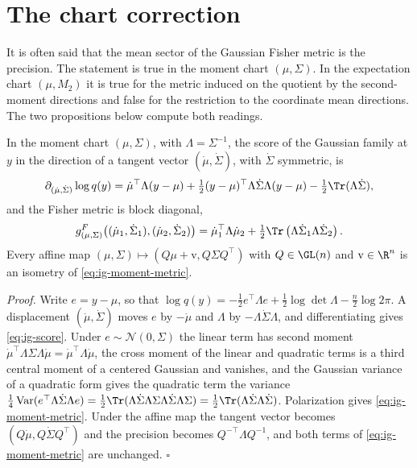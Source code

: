 \section{The chart correction}
\label{sec:ig-chart}

It is often said that the mean sector of the Gaussian Fisher metric is the
precision. The statement is true in the moment chart \((\mu,\Sigma)\). In the
expectation chart \((\mu,M_2)\) it is true for the metric induced on the
quotient by the second-moment directions and false for the restriction to the
coordinate mean directions. The two propositions below compute both readings.

In the moment chart \((\mu,\Sigma)\), with \(\Lambda=\Sigma^{-1}\), the score of
the Gaussian family at \(y\) in the direction of a tangent vector
\((\dot\mu,\dot\Sigma)\), with \(\dot\Sigma\) symmetric, is
\begin{equation}
\partial_{(\dot\mu,\dot\Sigma)}\log q(y)
=\dot\mu^\top\Lambda(y-\mu)
+\tfrac12(y-\mu)^\top\Lambda\dot\Sigma\Lambda(y-\mu)
-\tfrac12\Tr(\Lambda\dot\Sigma),
\label{eq:ig-score}
\end{equation}
and the Fisher metric is block diagonal,
\begin{equation}
g^F_{(\mu,\Sigma)}\bigl((\dot\mu_1,\dot\Sigma_1),(\dot\mu_2,\dot\Sigma_2)\bigr)
=\dot\mu_1^\top\Lambda\dot\mu_2
+\tfrac12\Tr\left(\Lambda\dot\Sigma_1\Lambda\dot\Sigma_2\right).
\label{eq:ig-moment-metric}
\end{equation}
Every affine map \((\mu,\Sigma)\mapsto(Q\mu+\mathrm v,Q\Sigma Q^\top)\) with
\(Q\in\GL(n)\) and \(\mathrm v\in\R^n\) is an isometry of \eqref{eq:ig-moment-metric}.

\noindent\emph{Proof.}
Write \(e=y-\mu\), so that
\(\log q(y)=-\tfrac12e^\top\Lambda e+\tfrac12\log\det\Lambda-\tfrac n2\log2\pi\).
A displacement \((\dot\mu,\dot\Sigma)\) moves \(e\) by \(-\dot\mu\) and
\(\Lambda\) by \(-\Lambda\dot\Sigma\Lambda\), and differentiating gives
\eqref{eq:ig-score}. Under \(e\sim\mathcal N(0,\Sigma)\) the linear term has
second moment \(\dot\mu^\top\Lambda\Sigma\Lambda\dot\mu=\dot\mu^\top\Lambda\dot\mu\),
the cross moment of the linear and quadratic terms is a third central moment of a
centered Gaussian and vanishes, and the Gaussian variance of a quadratic form
gives the quadratic term the variance
\(\tfrac14\operatorname{Var}(e^\top\Lambda\dot\Sigma\Lambda e)
=\tfrac12\Tr(\Lambda\dot\Sigma\Lambda\Sigma\Lambda\dot\Sigma\Lambda\Sigma)
=\tfrac12\Tr(\Lambda\dot\Sigma\Lambda\dot\Sigma)\). Polarization gives
\eqref{eq:ig-moment-metric}. Under the affine map the tangent vector becomes
\((Q\dot\mu,Q\dot\Sigma Q^\top)\) and the precision becomes
\(Q^{-\top}\Lambda Q^{-1}\), and both terms of \eqref{eq:ig-moment-metric} are
unchanged. \hfill$\square$

